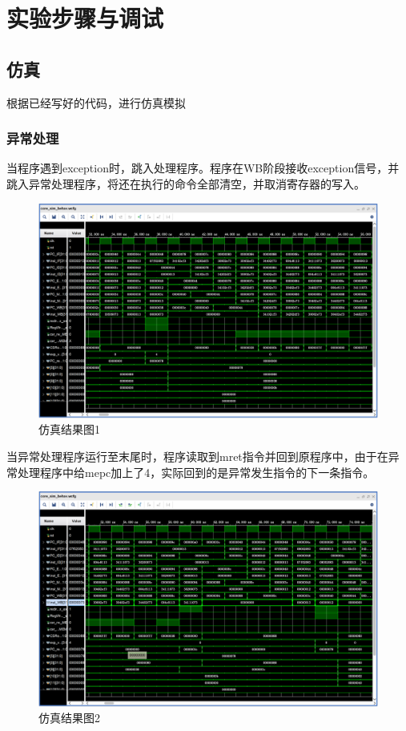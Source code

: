 
\section{实验步骤与调试}
\subsection{仿真} 根据已经写好的代码，进行仿真模拟\\
\subsubsection{异常处理}
当程序遇到exception时，跳入处理程序。程序在WB阶段接收exception信号，并跳入异常处理程序，将还在执行的命令全部清空，并取消寄存器的写入。
\begin{figure}[H] %
	\centering %
	\includegraphics[width=1.0\textwidth]{figs/1.png} %
	\caption{仿真结果图1} %
	\label{Fig.11} %
\end{figure}
当异常处理程序运行至末尾时，程序读取到mret指令并回到原程序中，由于在异常处理程序中给mepc加上了4，实际回到的是异常发生指令的下一条指令。
\begin{figure}[H] %
	\centering %
	\includegraphics[width=1.0\textwidth]{figs/2.png} %
	\caption{仿真结果图2} %
	\label{Fig.12} %
\end{figure}
